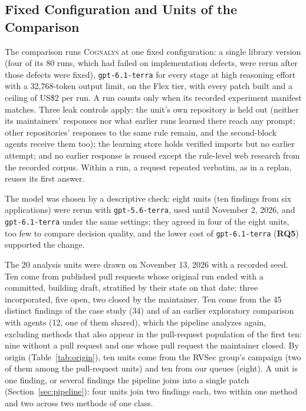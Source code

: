 \documentclass[conference]{IEEEtran}
\newcommand{\system}{\textsc{Cognalys}}
\newcommand{\researchq}[1]{\textbf{RQ#1}}
\begin{document}
\subsection{Fixed Configuration and Units of the Comparison}
\label{subsec:frozen}

The comparison runs {\system} at one fixed configuration: a single library
version (four of its 80 runs, which had failed on implementation
defects, were rerun after those defects were fixed), \texttt{gpt-6.1-terra} for every stage at high reasoning
effort with a 32,768-token output limit, on the Flex tier, with every patch
built and a ceiling of US\$2 per run. A run counts only when its recorded
experiment manifest matches. Three leak controls apply: the unit's own
repository is held out (neither its maintainers' responses nor what earlier
runs learned there reach any prompt; other repositories' responses to the same
rule remain, and the second-block agents receive them too); the learning store
holds verified imports but no earlier attempt; and no earlier response is
reused except the rule-level web research from the recorded corpus. Within a
run, a request repeated verbatim, as in a replan, reuses its first answer.

The model was chosen by a descriptive check: eight units (ten findings from
six applications) were rerun with \texttt{gpt-5.6-terra}, used until
November 2, 2026, and \texttt{gpt-6.1-terra}
under the same settings; they agreed in four of the eight units, too few to
compare decision quality, and the lower cost of \texttt{gpt-6.1-terra}
(\researchq{5}) supported the change.

The 20 analysis units were drawn on November 13, 2026 with a recorded seed.
Ten come from published pull requests whose original run ended with a
committed, building draft, stratified by their state on that date: three incorporated, five
open, two closed by the maintainer. Ten come from the 45 distinct findings of the case
study (34) and of an earlier exploratory comparison with agents (12, one of
them shared), which the pipeline analyzes again, excluding methods that also
appear in the pull-request population of the first ten: nine without a
pull request and one whose pull request the maintainer closed. By origin
(Table~\ref{tab:origin}), ten units come from the RVSec group's campaign (two
of them among the pull-request units) and ten from our queues (eight). A unit is one finding, or
several findings the pipeline joins into a single patch
(Section~\ref{sec:pipeline}): four units join two findings each, two within one
method and two across two methods of one class.
\end{document}

